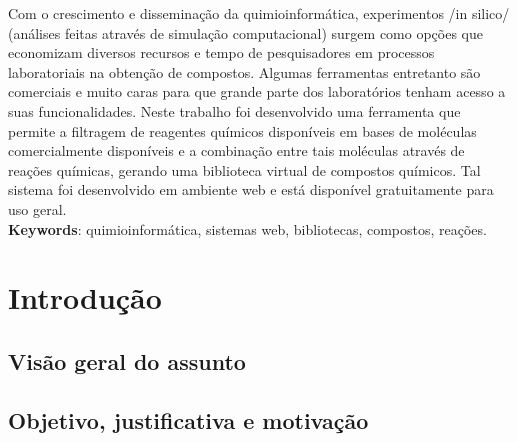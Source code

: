 \documentclass{abnt}
\begin{document}





 

\capa
\folhaderosto

\begin{resumo}
Com o crescimento e disseminação da quimioinformática, experimentos /in silico/
(análises feitas através de simulação computacional) surgem como opções que economizam
diversos recursos e tempo de pesquisadores em processos laboratoriais na obtenção
de compostos. Algumas ferramentas entretanto são comerciais e muito caras para que
grande parte dos laboratórios tenham acesso a suas funcionalidades. Neste trabalho
foi desenvolvido uma ferramenta que permite a filtragem de reagentes químicos disponíveis
em bases de moléculas comercialmente disponíveis e a combinação entre tais moléculas
através de reações químicas, gerando uma biblioteca virtual de compostos químicos.
Tal sistema foi desenvolvido em ambiente web e está disponível gratuitamente para
uso geral.\\

\textbf{Keywords}: quimioinformática, sistemas web, bibliotecas, compostos, reações.
\end{resumo}

\sumario
\listoffigures

\chapter{Introdução}

\section{Visão geral do assunto}

\section{Objetivo, justificativa e motivação}
\end{document}
